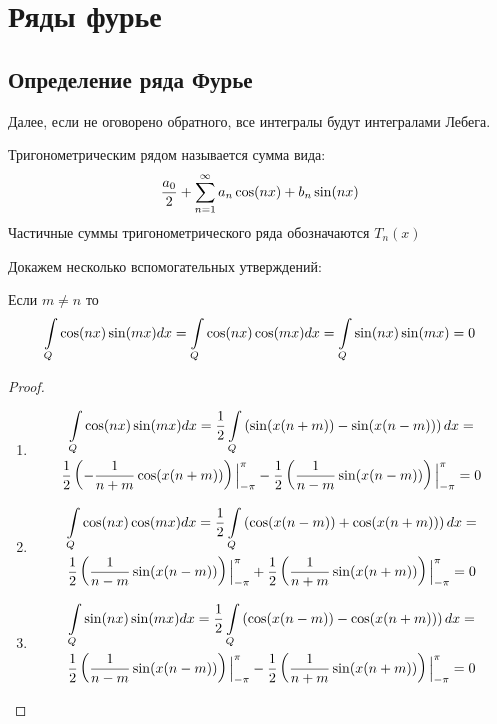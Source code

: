 \section{Ряды фурье}

\subsection{Определение ряда Фурье}

Далее, если не оговорено обратного, все интегралы будут интегралами Лебега.
\begin{definition}
	Тригонометрическим рядом называется сумма вида:
	\begin{gather*}
		\frac{a_0}{2} + \sum\limits_{n = 1}^{\infty} a_n \cos(nx) + b_n \sin(nx)
	\end{gather*}
	Частичные суммы тригонометрического ряда обозначаются $T_n(x)$
\end{definition}

Докажем несколько вспомогательных утверждений:
\begin{statement}
	Если $m \neq  n$ то
\begin{gather*}
	\int\limits_{Q}\cos(nx)\sin(mx)dx = \int\limits_{Q}\cos(nx)\cos(mx)dx = \int\limits_{Q}\sin(nx)\sin(mx) = 0
\end{gather*}
\end{statement}
	
\begin{proof}
	\begin{enumerate}
		\item 
			\begin{gather*}
				\int\limits_{Q}\cos(nx)\sin(mx)dx = 
				\frac{1}{2}\int\limits_{Q}\left( \sin(x(n + m)) - \sin(x(n - m))\right) dx =\\
				\frac{1}{2}\left( -\frac{1}{n + m}\cos(x(n + m))\right)\Big|_{-\pi}^{\pi} -
				\frac{1}{2}\left( \frac{1}{n - m}\sin(x(n - m))\right)\Big|_{-\pi}^{\pi} = 0
			\end{gather*}
		\item
			\begin{gather*}
				\int\limits_{Q}\cos(nx)\cos(mx)dx = 
				\frac{1}{2}\int\limits_{Q}\left( \cos(x(n - m)) + \cos(x(n + m))\right) dx =\\
				\frac{1}{2}\left( \frac{1}{n - m}\sin(x(n - m))\right)\Big|_{-\pi}^{\pi} +
				\frac{1}{2}\left( \frac{1}{n + m}\sin(x(n + m))\right)\Big|_{-\pi}^{\pi} = 0
			\end{gather*}
		\item
			\begin{gather*}
				\int\limits_{Q}\sin(nx)\sin(mx)dx = 
				\frac{1}{2}\int\limits_{Q}\left( \cos(x(n - m)) - \cos(x(n + m))\right) dx =\\
				\frac{1}{2}\left( \frac{1}{n - m}\sin(x(n - m))\right)\Big|_{-\pi}^{\pi} -
				\frac{1}{2}\left( \frac{1}{n + m}\sin(x(n + m))\right)\Big|_{-\pi}^{\pi} = 0
			\end{gather*}		
	\end{enumerate}
\end{proof}

